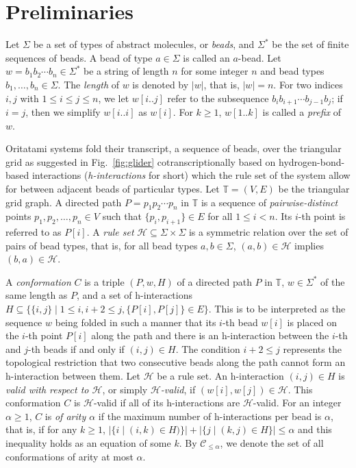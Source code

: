	\section{Preliminaries}

Let $\Sigma$ be a set of types of abstract molecules, or \textit{beads}, and $\Sigma^*$ be the set of finite sequences of beads. 
A bead of type $a \in \Sigma$ is called an $a$-bead. 
Let $w = b_1 b_2\cdots b_n \in \Sigma^*$ be a string of length $n$ for some integer $n$ and bead types $b_1, \ldots, b_n \in \Sigma$.
The \textit{length} of $w$ is denoted by $|w|$, that is, $|w| = n$. 
For two indices $i,j$ with $1\leq i \leq j \leq n$, we let $w[i..j]$ refer to the subsequence $b_i b_{i+1} \cdots b_{j-1} b_{j}$; if $i=j$, then we simplify $w[i..i]$ as $w[i]$.
For $k \ge 1$, $w[1..k]$ is called a \textit{prefix} of $w$. 

Oritatami systems fold their transcript, a sequence of beads, over the triangular grid as suggested in Fig.~\ref{fig:glider} cotranscriptionally based on hydrogen-bond-based interactions (\textit{h-interactions} for short) which the rule set of the system allow for between adjacent beads of particular types. 
Let $\mathbb{T} = (V, E)$ be the triangular grid graph. 
A directed path $P = p_1 p_2 \cdots p_n$ in $\mathbb{T}$ is a sequence of \textit{pairwise-distinct} points $p_1, p_2, \ldots, p_n \in V$ such that $\{p_i, p_{i+1}\} \in E$ for all $1 \leq i < n$.
Its $i$-th point is referred to as $P[i]$. 
A \textit{rule set} $\mathcal{H} \subseteq \Sigma \times \Sigma$ is a symmetric relation over the set of pairs of bead types, that is, for all bead types $a, b \in \Sigma$, $(a, b) \in \mathcal{H}$ implies $(b, a) \in \mathcal{H}$. 

A \textit{conformation} $C$ is a triple $(P, w, H)$ of a directed path $P$ in $\mathbb{T}$, $w \in \Sigma^*$ of the same length as $P$, and a set of h-interactions $H \subseteq \{\{i,j\} \mid 1 \leq i, i+2 \leq j, \{P[i], P[j]\} \in E\}$.
This is to be interpreted as the sequence $w$ being folded in such a manner that its $i$-th bead $w[i]$ is placed on the $i$-th point $P[i]$ along the path and there is an h-interaction between the $i$-th and $j$-th beads if and only if $(i, j) \in H$. 
The condition $i+2 \leq j$ represents the topological restriction that two consecutive beads along the path cannot form an h-interaction between them.
Let $\mathcal{H}$ be a rule set. 
An h-interaction $(i, j) \in H$ is \textit{valid with respect to $\mathcal{H}$}, or simply \textit{$\mathcal{H}$-valid}, if $(w[i], w[j]) \in \mathcal{H}$. 
This conformation $C$ is $\mathcal{H}$-valid if all of its h-interactions are $\mathcal{H}$-valid. 
For an integer $\alpha \ge 1$, $C$ is \textit{of arity $\alpha$} if the maximum number of h-interactions per bead is $\alpha$, that is, if for any $k \ge 1$, $|\{i \mid (i, k) \in H)\}| + |\{j \mid (k, j) \in H\}| \le \alpha$ and this inequality holds as an equation of some $k$. 
By $\mathcal{C}_{\le \alpha}$, we denote the set of all conformations of arity at most $\alpha$.

